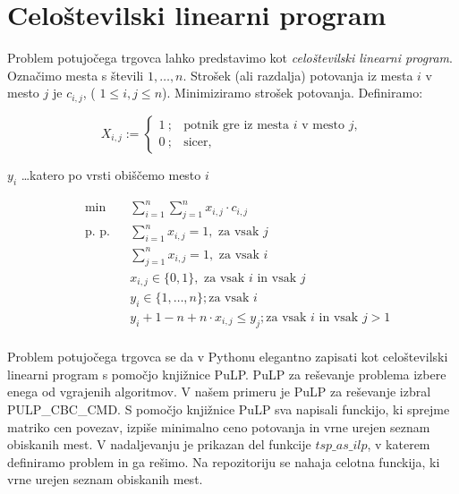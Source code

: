 \documentclass[12pt,a4paper]{amsart}
\theoremstyle{definition} %
\theoremstyle{plain} %
\begin{document}
\section{Celoštevilski linearni program} 

Problem potujočega trgovca lahko predstavimo kot \textit{celoštevilski linearni program}.
Označimo mesta s števili $1, \ldots, n$. Strošek (ali razdalja) potovanja iz mesta $i$ v mesto $j$ je $c_{i,j}$, ( $ 1\leq i, j\leq n$). Minimiziramo strošek potovanja. Definiramo:

$$ X_{i,j} := \left\{ \begin{array}{ll}
1 ~; & \textrm{potnik gre iz mesta $i$ v mesto $j$}, \\
0 ~; & \textrm{sicer},
\end{array} \right. $$

\hfill \break

$y_{i}$ \ldots katero po vrsti obiščemo mesto $i$

\begin{equation*}
\begin{aligned}
& {\text{min}}
& & \sum_{i=1}^{n} \sum_{j=1}^{n}  x_{i,j} \cdot c_{i,j} \\
& \text{p. p.}
& &\sum_{i=1}^{n} x_{i,j} = 1, \text{ za vsak $j$ }\\
&&&\sum_{j=1}^{n} x_{i,j} = 1, \text{ za vsak $i$ }\\
&&&  x_{i,j} \in \{0,1\}, \text{ za vsak $i$ in vsak $j$ }\\
&&& y_{i} \in \{1, \ldots, n\}; \text{za vsak $i$}\\
&&& y_{i} + 1 - n + n \cdot x_{i,j} \leq y_{j}; \text{za vsak $i$ in vsak $j>1$}
\end{aligned}
\end{equation*}
\\
Problem potujočega trgovca se da v Pythonu elegantno zapisati kot celoštevilski linearni program s pomočjo knjižnice PuLP. PuLP za reševanje problema izbere enega od vgrajenih algoritmov.
 V našem primeru je PuLP za reševanje izbral PULP\_CBC\_CMD. S pomočjo knjižnice PuLP sva napisali funckijo, ki sprejme matriko cen povezav, izpiše minimalno ceno potovanja in vrne urejen seznam obiskanih mest.
 V nadaljevanju je prikazan del funkcije $ tsp\_as\_ilp$, v katerem definiramo problem in ga rešimo. Na repozitoriju se nahaja celotna funckija, ki vrne urejen seznam obiskanih mest.
\end{document}
